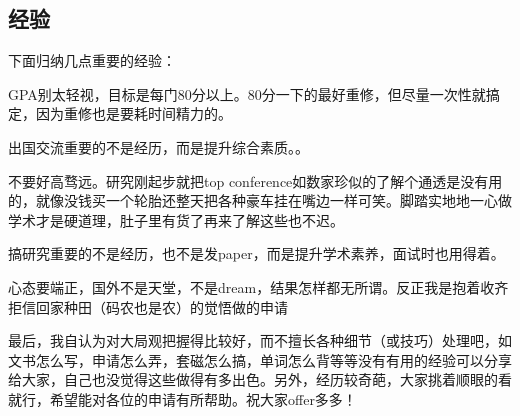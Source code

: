  
\subsection{经验}
下面归纳几点重要的经验：\par

GPA别太轻视，目标是每门80分以上。80分一下的最好重修，但尽量一次性就搞定，因为重修也是要耗时间精力的。\par
出国交流重要的不是经历，而是提升综合素质。。\par
不要好高骛远。研究刚起步就把top conference如数家珍似的了解个通透是没有用的，就像没钱买一个轮胎还整天把各种豪车挂在嘴边一样可笑。脚踏实地地一心做学术才是硬道理，肚子里有货了再来了解这些也不迟。\par
搞研究重要的不是经历，也不是发paper，而是提升学术素养，面试时也用得着。\par
心态要端正，国外不是天堂，不是dream，结果怎样都无所谓。反正我是抱着收齐拒信回家种田（码农也是农）的觉悟做的申请\par

最后，我自认为对大局观把握得比较好，而不擅长各种细节（或技巧）处理吧，如文书怎么写，申请怎么弄，套磁怎么搞，单词怎么背等等没有有用的经验可以分享给大家，自己也没觉得这些做得有多出色。另外，经历较奇葩，大家挑着顺眼的看就行，希望能对各位的申请有所帮助。祝大家offer多多！